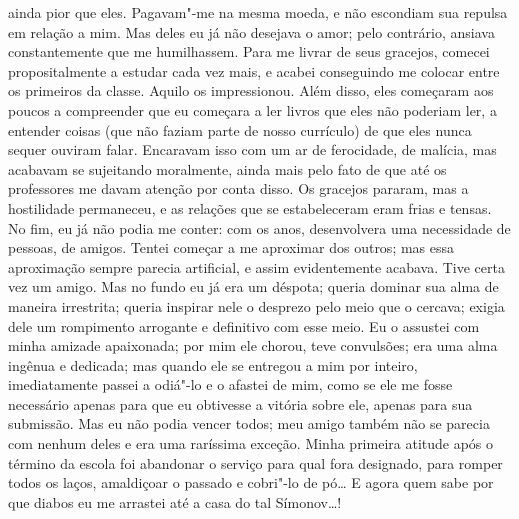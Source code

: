 ainda pior que eles. Pagavam"-me na mesma moeda, e não escondiam sua
repulsa em relação a mim. Mas deles eu já não desejava o amor; pelo
contrário, ansiava constantemente que me humilhassem. Para me livrar de
seus gracejos, comecei propositalmente a estudar cada vez mais, e
acabei conseguindo me colocar entre os primeiros da classe. Aquilo os
impressionou. Além disso, eles começaram aos poucos a compreender que
eu começara a ler livros que eles não poderiam ler, a entender coisas
(que não faziam parte de nosso currículo) de que eles nunca sequer
ouviram falar. Encaravam isso com um ar de ferocidade, de malícia, mas
acabavam se sujeitando moralmente, ainda mais pelo fato de que até os
professores me davam atenção por conta disso. Os gracejos pararam, mas
a hostilidade permaneceu, e as relações que se estabeleceram eram frias
e tensas. No fim, eu já não podia me conter: com os anos, desenvolvera
uma necessidade de pessoas, de amigos. Tentei começar a me aproximar
dos outros; mas essa aproximação sempre parecia artificial, e assim
evidentemente acabava. Tive certa vez um amigo. Mas no fundo eu já era
um déspota; queria dominar sua alma de maneira irrestrita; queria
inspirar nele o desprezo pelo meio que o cercava; exigia dele um
rompimento arrogante e definitivo com esse meio. Eu o assustei com
minha amizade apaixonada; por mim ele chorou, teve convulsões; era uma
alma ingênua e dedicada; mas quando ele se entregou a mim por inteiro,
imediatamente passei a odiá"-lo e o afastei de mim, como se ele me fosse
necessário apenas para que eu obtivesse a vitória sobre ele, apenas
para sua submissão. Mas eu não podia vencer todos; meu amigo também não
se parecia com nenhum deles e era uma raríssima exceção. Minha primeira
atitude após o término da escola foi abandonar o serviço para qual fora
designado, para romper todos os laços, amaldiçoar o passado e cobri"-lo
de pó\ldots{} E agora quem sabe por que diabos eu me arrastei até a casa do
tal Símonov\ldots{}!

